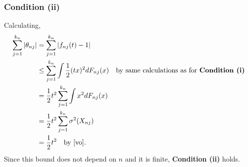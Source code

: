 \documentclass[letterpaper, 12pt]{article}
\begin{document}
\subsubsection*{Condition (ii)}
Calculating,
\begin{align*}
\sum_{j=1}^{k_n} |\theta_{nj}|
&=
\sum_{j=1}^{k_n} |f_{nj}(t) - 1|
\\
&\leq
\sum_{j=1}^{k_n}
\int
\frac{1}{2} (tx)^2
dF_{nj}(x)
\quad
\text{by same calculations as for \textbf{Condition (i)}}
\\
&=
\frac{1}{2}t^2 
\sum_{j=1}^{k_n}
\int
x^2
dF_{nj}(x)
\\
&=
\frac{1}{2}t^2 
\sum_{j=1}^{k_n}
\sigma^2(X_{nj})
\\
&=
\frac{1}{2}t^2 
\quad
\text{by \eqref{vo}.}
\end{align*}
Since this bound does not depend on $n$ and it is finite, \textbf{Condition (ii)} holds.
\end{document}

